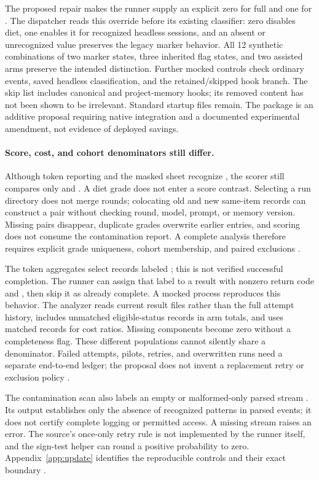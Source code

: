 The proposed repair makes the runner supply an explicit zero for full  and one for . The dispatcher reads this override before its existing classifier: zero disables diet, one enables it for recognized headless sessions, and an absent or unrecognized value preserves the legacy marker behavior. All 12 synthetic combinations of two marker states, three inherited flag states, and two assisted arms preserve the intended distinction. Further mocked controls check ordinary events, saved headless classification, and the retained/skipped hook branch. The skip list includes canonical and project-memory hooks; its removed content has not been shown to be irrelevant. Standard startup files remain. The package is an additive proposal requiring native integration and a documented experimental amendment, not evidence of deployed savings.

\paragraph{Score, cost, and cohort denominators still differ.}
Although token reporting and the masked sheet recognize , the scorer still compares only  and . A diet grade does not enter a score contrast. Selecting a run directory does not merge rounds; colocating old and new same-item records can construct a pair without checking round, model, prompt, or memory version. Missing pairs disappear, duplicate grades overwrite earlier entries, and scoring does not consume the contamination report. A complete analysis therefore requires explicit grade uniqueness, cohort membership, and paired exclusions \citep{benchmark_update_ab30_analyzer}.

The token aggregates select records labeled ; this is not verified successful completion. The runner can assign that label to a result with nonzero return code and , then skip it as already complete. A mocked process reproduces this behavior. The analyzer reads current result files rather than the full attempt history, includes unmatched eligible-status records in arm totals, and uses matched records for cost ratios. Missing components become zero without a completeness flag. These different populations cannot silently share a denominator. Failed attempts, pilots, retries, and overwritten runs need a separate end-to-end ledger; the proposal does not invent a replacement retry or exclusion policy \citep{benchmark_update_ab30_runner,benchmark_update_ab30_analyzer}.

The contamination scan also labels an empty or malformed-only parsed stream . Its output establishes only the absence of recognized patterns in parsed events; it does not certify complete logging or permitted access. A missing stream raises an error. The source's once-only retry rule is not implemented by the runner itself, and the sign-test helper can round a positive probability to zero. Appendix~\ref{app:update} identifies the reproducible controls and their exact boundary \citep{benchmark_update_ab30_analyzer,benchmark_update_ab30_prereg}.
